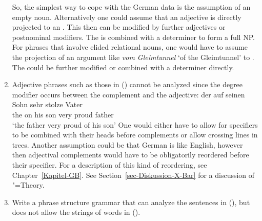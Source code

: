 \begin{enumerate}
So, the simplest way to cope with the German data is the assumption of an empty noun. Alternatively
one could assume that an adjective is directly projected to an \nbar. This \nbar then can be
modified by further adjectives or postnominal modifiers. The \nbar is combined with a determiner to
form a full NP. For phrases that involve elided relational nouns, one would have to assume the projection of an argument like \emph{vom Gleimtunnel} `of the
Gleimtunnel' to  \nbar. The \nbar could be further modified or combined with a determiner directly.

\item Adjective phrases such as those in () cannot be analyzed since the degree modifier
occurs between the complement and the adjective:
\ea
\gll der auf seinen Sohn sehr stolze Vater\\
	 the on his son very proud father\\
\glt `the father very proud of his son'
\z
One would either have to allow for specifiers to be combined with their heads before complements or allow crossing lines in trees. Another assumption
could be that German is like English, however then adjectival complements would have to be obligatorily reordered before their specifier. For
a description of this kind of reordering, see Chapter~\ref{Kapitel-GB}. See Section~\ref{sec-Diskussion-X-Bar} for a discussion of \xbar"=Theory.

\item Write a phrase structure grammar that can analyze the sentences in (), but does not allow the strings of words in ().
      \eal
      \zl
      \eal
      \zl


\end{enumerate}
